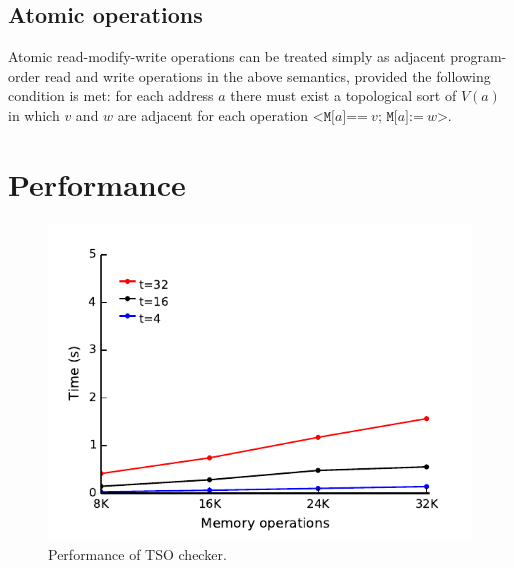 \documentclass[11pt]{article}
\begin{document}
\subsection*{Atomic operations}

Atomic read-modify-write operations can be treated simply as adjacent
program-order read and write operations in the above semantics,
provided the following condition is met: for each address $a$ there
must exist a topological sort of $V(a)$ in which $v$ and $w$ are
adjacent for each operation $\texttt{<M[}a\texttt{]==}~v\texttt{;
M[}a\texttt{]:=}~w\texttt{>}$.

\section{Performance}
\label{Section:Performance}

\begin{figure}
\begin{center}
\includegraphics{performance/tso.pdf}
\end{center}
\caption{Performance of TSO checker.}
\label{Graph:TSO}
\end{figure}
\end{document}
